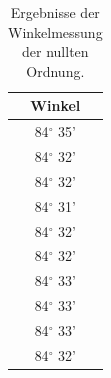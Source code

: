 \documentclass[12pt,a4paper]{article}
\begin{document}
	\begin{table}
		\begin{center}
			\begin{tabular}{|c|}
				\hline
				Winkel \\
				\hline
				84$^{\circ}$ 35'\\
				\hline
				84$^{\circ}$ 32'\\
				\hline
				84$^{\circ}$ 32'\\
				\hline
				84$^{\circ}$ 31'\\
				\hline
				84$^{\circ}$ 32'\\
				\hline
				84$^{\circ}$ 32'\\
				\hline
				84$^{\circ}$ 33'\\
				\hline
				84$^{\circ}$ 33'\\
				\hline
				84$^{\circ}$ 33'\\
				\hline
				84$^{\circ}$ 32'\\
				\hline
			\end{tabular}
			\caption{Ergebnisse der Winkelmessung der nullten Ordnung.}
			\label{tab:RohdatenRauschmessungGitter}
		\end{center}
	\end{table}
	
\end{document}

